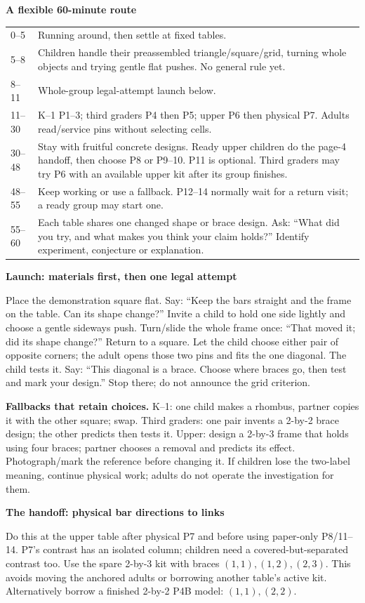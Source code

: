 \documentclass[letterpaper,11pt]{article}
\newcommand{\titleline}[1]{\par{\large\bfseries #1}\par}
\newcommand{\sub}[1]{\par\textbf{#1}\par}
\begin{document}
\sub{A flexible 60-minute route}
\begin{tabularx}{\linewidth}{@{}lX@{}}0--5 & Running around, then settle at fixed tables.\\
5--8 & Children handle their preassembled triangle/square/grid, turning whole objects and trying gentle flat pushes. No general rule yet.\\
8--11 & Whole-group legal-attempt launch below.\\
11--30 & K--1 P1--3; third graders P4 then P5; upper P6 then physical P7. Adults read/service pins without selecting cells.\\
30--48 & Stay with fruitful concrete designs. Ready upper children do the page-4 handoff, then choose P8 or P9--10. P11 is optional. Third graders may try P6 with an available upper kit after its group finishes.\\
48--55 & Keep working or use a fallback. P12--14 normally wait for a return visit; a ready group may start one.\\
55--60 & Each table shares one changed shape or brace design. Ask: ``What did you try, and what makes you think your claim holds?'' Identify experiment, conjecture or explanation.
\end{tabularx}

\sub{Launch: materials first, then one legal attempt}
Place the demonstration square flat. Say: ``Keep the bars straight and the frame on the table. Can its shape change?'' Invite a child to hold one side lightly and choose a gentle sideways push. Turn/slide the whole frame once: ``That moved it; did its shape change?'' Return to a square. Let the child choose either pair of opposite corners; the adult opens those two pins and fits the one diagonal. The child tests it. Say: ``This diagonal is a brace. Choose where braces go, then test and mark your design.'' Stop there; do not announce the grid criterion.

\textbf{Fallbacks that retain choices.} K--1: one child makes a rhombus, partner copies it with the other square; swap. Third graders: one pair invents a 2-by-2 brace design; the other predicts then tests it. Upper: design a 2-by-3 frame that holds using four braces; partner chooses a removal and predicts its effect. Photograph/mark the reference before changing it. If children lose the two-label meaning, continue physical work; adults do not operate the investigation for them.

\newpage
\titleline{The handoff: physical bar directions to links}
Do this at the upper table after physical P7 and before using paper-only P8/11--14. P7's contrast has an isolated column; children need a covered-but-separated contrast too. Use the spare 2-by-3 kit with braces $(1,1),(1,2),(2,3)$. This avoids moving the anchored adults or borrowing another table's active kit. Alternatively borrow a finished 2-by-2 P4B model: $(1,1),(2,2)$.
\end{document}
